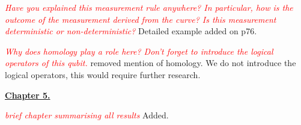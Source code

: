 \documentclass[11pt,oneside]{article}
\newcommand{\danbrowne}[1]{\vspace{10pt}\noindent\textcolor{red}{{\it #1}}}
\begin{document}
\danbrowne{Have you explained this measurement rule anywhere? In particular, how is the outcome of the measurement derived from the curve? Is this measurement deterministic or non-deterministic?}
Detailed example added on p76.


\danbrowne{Why does homology play a role here? Don't forget to introduce the logical operators of this qubit. }
removed mention of homology. We do not introduce the logical operators, this would require further research.


{\vspace{20pt}\noindent \bf \underline{Chapter 5.}}

\danbrowne{brief chapter summarising all results}
Added.

\end{document}
